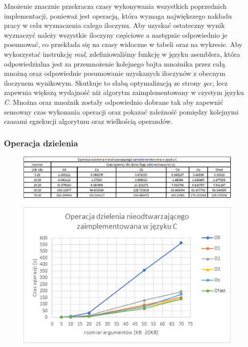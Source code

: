 \documentclass{article}
\begin{document}
\vspace{5mm}

Mnożenie znacznie przekracza czasy wykonywania wszystkich poprzednich implementacji, ponieważ jest operacją, która wymaga największego nakładu pracy w celu wyznaczenia całego iloczynu. Aby uzyskać ostateczny wynik wyznaczyć należy wszystkie iloczyny częściowe a następnie odpowiednio je posumować, co przekłada się na czasy widoczne w tabeli oraz na wykresie. Aby wykorzystać instrukcję \textit{mul}, zdefiniowaliśmy funkcję w języku asemblera, która odpowiedzialna jest za przemnożenie kolejnego bajta mnożnika przez całą mnożną oraz odpowiednie posumowanie uzyskanych iloczynów z obecnym iloczynem wynikowym. Skutkuje to słabą optymalizacją ze strony \textit{gcc}, lecz zapewnia większą wydajność niż algorytm zaimplementowany w czystym języku \textit{C}. Mnożna oraz mnożnik zostały odpowiednio dobrane tak aby zapewnić sensowny czas wykonania operacji oraz pokazać zależność pomiędzy kolejnymi czasami egzekucji algorytmu oraz wielkością operandów.


\newpage{}

\subsubsection{Operacja dzielenia}

\begin{figure}[h!]

\includegraphics[scale=0.65]{charts/divide_c.png}

\end{figure}

\begin{figure}[h!]
\centering
\includegraphics[scale=0.75]{charts/divide_c_p.png}

\end{figure}
\end{document}
